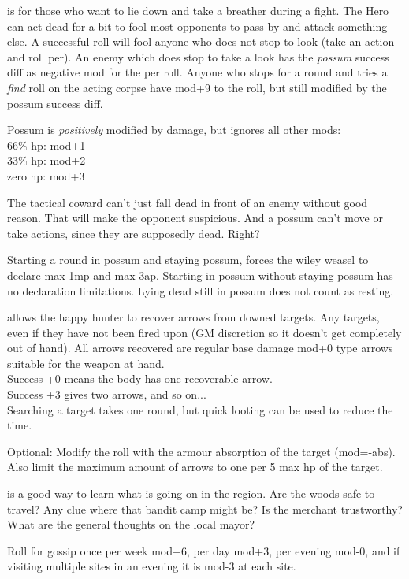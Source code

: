  is for those who want to lie down and take a breather during a fight. The Hero can act dead for a bit to fool most opponents to pass by and attack something else. A successful roll will fool anyone who does not stop to look (take an action and roll per). An enemy which does stop to take a look has the \emph{possum} success diff as negative mod for the per roll. Anyone who stops for a round and tries a \emph{find} roll on the acting corpse have mod+9 to the roll, but still modified by the possum success diff.

Possum is \emph{positively} modified by damage, but ignores all other mods:\\
66\% hp: mod+1\\
33\% hp: mod+2\\
zero hp: mod+3

The tactical coward can't just fall dead in front of an enemy without good reason. That will make the opponent suspicious. And a possum can't move or take actions, since they are supposedly dead. Right?

Starting a round in possum and staying possum, forces the wiley weasel to declare max 1mp and max 3ap. Starting in possum without staying possum has no declaration limitations. Lying dead still in possum does not count as resting.


 allows the happy hunter to recover arrows from downed targets. Any targets, even if they have not been fired upon (GM discretion so it doesn't get completely out of hand). All arrows recovered are regular base damage mod+0 type arrows suitable for the weapon at hand.\\
Success +0 means the body has one recoverable arrow. \\
Success +3 gives two arrows, and so on...\\
Searching a target takes one round, but quick looting can be used to reduce the time.

Optional: Modify the roll with the armour absorption of the target (mod=-abs). Also limit the maximum amount of arrows to one per 5 max hp of the target.


 is a good way to learn what is going on in the region. Are the woods safe to travel? Any clue where that bandit camp might be? Is the merchant trustworthy? What are the general thoughts on the local mayor?

Roll for gossip once per week mod+6, per day mod+3, per evening mod-0, and if visiting multiple sites in an evening it is mod-3 at each site.

